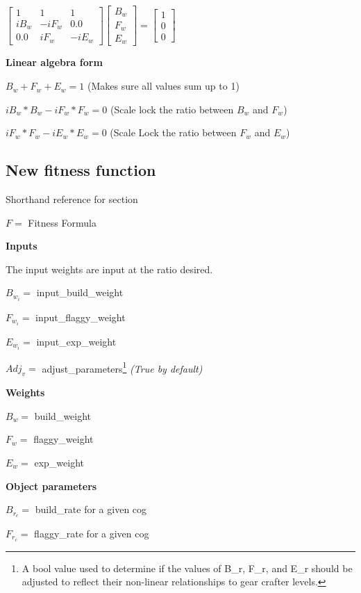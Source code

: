\documentclass[12pt, letterpaper]{article}
\begin{document}
$\begin{bmatrix}
1 & 1 & 1\\
iB_w & -iF_w & 0.0\\
0.0 & iF_w & -iE_w
\end{bmatrix}
\begin{bmatrix}
B_w\\
F_w\\
E_w
\end{bmatrix}
=
\begin{bmatrix}
1\\
0\\
0
\end{bmatrix}$

\textbf{Linear algebra form}

$B_w+F_w+E_w = 1$ (Makes sure all values sum up to 1)

$iB_w*B_w-iF_w*F_w = 0$ (Scale lock the ratio between $B_w$ and $F_w$)

$iF_w*F_w-iE_w*E_w = 0$ (Scale Lock the ratio between $F_w$ and $E_w$)

\clearpage

\subsection{New fitness function}

Shorthand reference for section

$F =$ Fitness Formula\

\textbf{Inputs}

The input weights are input at the ratio desired.

$B_{w_i} =$ input\_build\_weight

$F_{w_i} =$ input\_flaggy\_weight

$E_{w_i} =$ input\_exp\_weight

$Adj_v =$ adjust\_parameters\footnote{A bool value used to determine if the values of B\_r, F\_r, and E\_r should be adjusted to reflect their non-linear relationships to gear crafter levels.} \textit{(True by default)}

\textbf{Weights}

$B_w =$ build\_weight

$F_w =$ flaggy\_weight

$E_w =$ exp\_weight

\textbf{Object parameters}

$B_{r_c} =$ build\_rate for a given cog

$F_{r_c} =$ flaggy\_rate for a given cog
\end{document}
